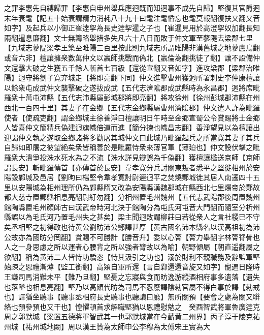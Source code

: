 之罪李惠先自縛歸罪【李惠自申州舉兵應迥既而知迥事不成先自歸】堅復其官爵迥末年衰耄【記五十始衰謂精力消耗八十九十曰耄注耄惛忘也耄莫報翻復扶又翻又音如字】及起兵以小御正崔逹挐為長史逹挐暹之子也【崔暹見用於高澄挐奴加翻長知兩翻暹息廉翻】文士無籌略舉措多失凡六十八日而敗于仲文軍至蓼隄去梁郡七里【九域志蓼隄梁孝王築至睢陽三百里按此則九域志所謂睢陽非漢舊城之地蓼盧鳥翻或音六非】檀讓擁衆數萬仲文以羸師挑戰而偽北【羸倫為翻挑徒了翻】讓不設備仲文還擊大破之生獲五千餘人斬首七百級【還從宣翻又音如字】進攻梁郡【梁郡治睢陽】迥守將劉子寛弃城走【將即亮翻下同】仲文進擊曹州獲迥所署刺史李仲康檀讓以餘衆屯成武仲文襲擊破之遂拔成武【五代志濟隂郡成武縣時為永昌郡】迥將席毗羅衆十萬屯沛縣【五代志沛縣屬彭城郡將即亮翻】將攻徐州【徐州彭城郡沛縣在州西北一百四十里】其妻子在金鄉【五代志金鄉縣屬曹州濟隂郡】仲文遣人詐為毗羅使者【使疏吏翻】謂金鄉城主徐善淨曰檀讓明日午時至金鄉宣蜀公令賞賜將士金鄉人皆喜仲文簡精兵偽建迥旗幟倍道而進【簡分揀也幟昌志翻】善淨望見以為檀讓出迎謁仲文執之遂取金鄉諸將多勸屠其城仲文曰此城乃毗羅起兵之所當寛其妻子其兵自歸如即屠之彼望絶矣衆皆稱善於是毗羅恃衆來薄官軍【薄廹也】仲文設伏擊之毗羅衆大潰爭投洙水死水為之不流【洙水詳見辯誤為千偽翻】獲檀讓檻送京師【京師謂長安】斬毗羅傳首【亦傳首於長安】韋孝寛分兵討關東叛者悉平之堅徙相州於安陽毁鄴城及邑居【劉昫曰楊堅令韋孝寛討尉遲迥平之焚燒鄴城徙其居人南遷四十五里以安陽城為相州理所仍為鄴縣隋又改為安陽縣漢魏郡城在縣西北七里煬帝於鄴故都大慈寺置鄴縣相息亮翻尉紆勿翻】分相州置毛州魏州【五代志武陽郡後周置魏州館陶縣置毛州顔師古曰漢武帝時河北決于館陶分為屯氏河屯音大門翻而隨室分析州縣誤以為毛氏河乃置毛州失之甚矣】梁主聞迥敗謂柳莊曰若從衆人之言社稷已不守矣丞相堅之初得政也待黄公劉昉沛公鄭譯甚厚【黄古國名沛本縣名以漢高祖初為沛公故亦為國昉分罔翻】賞賜不可勝計【勝音升】委以心膂【膂力舉翻字林膂脊骨也人之一身思慮之所以運者心腰背之所以強者膂故以為喻】朝野傾屬【朝直遥翻屬之欲翻】稱為黄沛二人皆恃功驕恣【恃其汲引之功也】溺於財利不親職務及辭監軍堅始疎之恩禮漸薄【監工銜翻】高熲自軍所還【言自鄴還還音旋又如字】寵遇日隆時王謙司馬消難未平【難乃旦翻】堅憂之忘寢與食而昉逸游縱酒相府事多遺落【遺失也落墜也相息亮翻】堅乃以高熲代昉為司馬不忍廢譯隂勑官屬不得白事於譯【勑戒也】譯猶坐聽事【聽事丞相府長史聽事也聽讀曰廳】無所關預【要會之處為關又聨絡也預參預也又干也】惶懼頓首求解職堅猶以恩禮慰勉之　癸酉智武將軍魯廣逹克周之郭默城【梁置五德將軍智武其一也郭默城當在今蘄黄二州界】丙子淳于陵克祐州城【祐州城地闕】周以漢王贊為太師申公李穆為太傅宋王實為大

